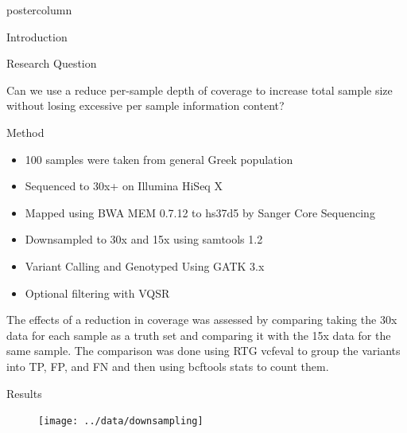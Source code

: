 \documentclass[final,xcolor=table]{beamer}
\begin{document}
\begin{frame}{}
\begin{columns}[t]
\begin{column}{.49\textwidth}
\begin{beamercolorbox}[center,wd=\textwidth]{postercolumn}
\begin{minipage}[T]{.95\textwidth}
\begin{block}{Introduction}
            \end{block}
            \begin{block}{Research Question}
\begin{figure}
\centering
{}
\end{figure}
                Can we use a reduce per-sample depth of coverage to increase total sample size without losing excessive per sample information content?
            \end{block}
            \begin{block}{Method}
                \begin{itemize} 
                    \item 100 samples were taken from general Greek population
                    \item Sequenced to 30x+ on Illumina HiSeq X
                    \item Mapped using BWA MEM 0.7.12 to hs37d5 by Sanger Core Sequencing
                    \item Downsampled to 30x and 15x using samtools 1.2
                    \item Variant Calling and Genotyped Using GATK 3.x
                    \item Optional filtering with VQSR
                \end{itemize}
                {The effects of a reduction in coverage was assessed by comparing taking the 30x data for each sample as a truth set and comparing it with the 15x data for the same sample. The comparison was done using RTG vcfeval to group the variants into TP, FP, and FN and then using bcftools stats to count them.}
            \end{block}
            \begin{block}{Results}
                \begin{figure}
                \texttt{[image: ../data/downsampling]}

\end{figure}
\end{block}
\end{minipage}
\end{beamercolorbox}
\end{column}
\end{columns}
\end{frame}
\end{document}
